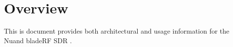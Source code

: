 \section{Overview} \label{sec:overview}

This is document provides both architectural and usage information for the
Nuand bladeRF \ac{SDR} \cite{BLADERF}.

